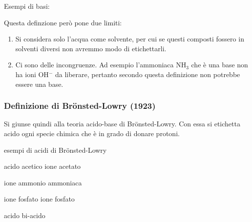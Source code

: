 \vspace{0.2cm}Esempi di basi:

\vspace{0.2cm}

\vspace{0.2cm}

\vspace{0.2cm}

\vspace{0.2cm}Questa definzione però pone due limiti:

\begin{enumerate}
    \item Si considera solo l'acqua come solvente, per cui se questi composti fossero in solventi diversi non avremmo modo di etichettarli.
    \item Ci sono delle incongruenze. Ad esempio l'ammoniaca NH$_3$ che è una base non ha ioni OH$^-$ da liberare, pertanto secondo questa definizione non potrebbe essere una base.
\end{enumerate}
\subsubsection{Definizione di Brönsted-Lowry (1923)}
Si giunse quindi alla teoria acido-base di Brönsted-Lowry. Con essa si etichetta acido ogni specie chimica che è in grado di donare protoni.

\vspace{0.2cm}esempi di acidi di Brönsted-Lowry

\vspace{0.2cm}

acido acetico \hspace{2.55cm} ione acetato 

\vspace{0.2cm}

ione ammonio \hspace{1.35cm} ammoniaca

\vspace{0.2cm}

ione fosfato \hspace{2.25cm} ione fosfato

acido \hspace{3.4cm} bi-acido

